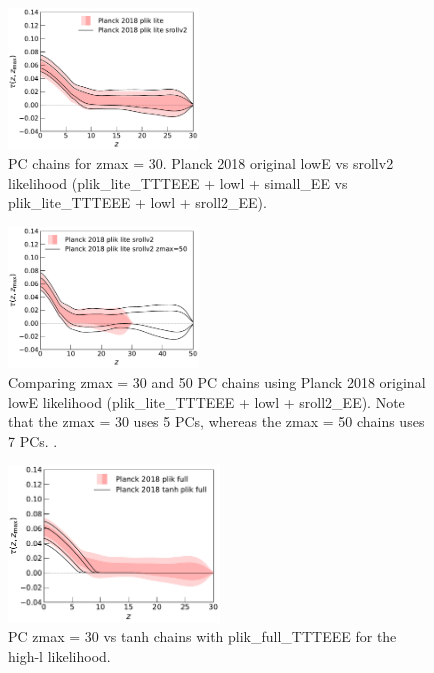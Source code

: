 \documentclass[prd,twocolumn,amsmath,amssymb,floatfix,superscriptaddress,nofootinbib]{revtex4-1}
\begin{document}
\begin{figure}[ht]
\includegraphics[width=0.45\textwidth]{results/direct_mcmc/pl18_plots_zmax30/plot_pub_tau_gtz_dz_0p1_pl18_pc_zmax30_pliklite_post_0930_and_pl18_pc_zmax30_pliklite_srollv2_0930.pdf}
\caption{PC chains for zmax = 30. Planck 2018 original lowE vs srollv2 likelihood (plik\_lite\_TTTEEE + lowl + simall\_EE vs plik\_lite\_TTTEEE + lowl + sroll2\_EE).
}
\label{fig:}
\end{figure}

\begin{figure}[ht]
\includegraphics[width=0.45\textwidth]{results/direct_mcmc/pl18_plots_zmax30/plot_pub_tau_gtz_dz_0p1_pl18_pc_zmax30_pliklite_srollv2_0930_and_pl18_pc_zmax50_pliklite_srollv2.pdf}
\caption{Comparing zmax = 30 and 50 PC chains using Planck 2018 original lowE likelihood (plik\_lite\_TTTEEE + lowl + sroll2\_EE). Note that the zmax = 30 uses 5 PCs, whereas the zmax = 50 chains uses 7 PCs. .
}
\label{fig:}
\end{figure}

\begin{figure}[ht]
\includegraphics[width=0.5\textwidth]{results/direct_mcmc/pl18_plots_zmax30/plot_pub_tau_gtz_dz_0p1_pl18_pc_zmax30_plikfull_and_pl18_tanh_post_plikfull.pdf}
\caption{PC zmax = 30 vs tanh chains with plik\_full\_TTTEEE for the high-l likelihood.
}
\label{fig:}
\end{figure}
\end{document}
